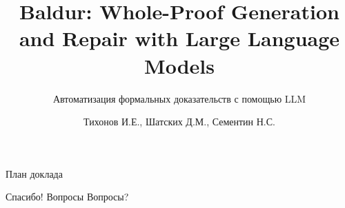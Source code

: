 \documentclass[aspectratio=169]{beamer}
\title[Baldur]{Baldur: Whole-Proof Generation and Repair with Large Language Models}
\subtitle{Автоматизация формальных доказательств с помощью LLM}
\author{Тихонов И.Е., Шатских Д.М., Сементин Н.С.}
\institute{}
\date{}
\begin{document}
\frame{\titlepage}








\begin{frame}{План доклада}
\tableofcontents
\end{frame}










\begin{frame}{Спасибо! Вопросы}
\centering
\Large Вопросы?
\end{frame}
\end{document}
